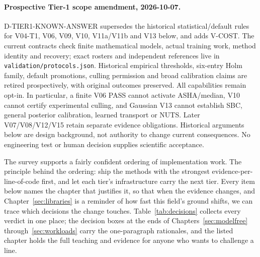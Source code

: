 \paragraph{Prospective Tier-1 scope amendment, 2026-10-07.}
D-TIER1-KNOWN-ANSWER supersedes the historical statistical/default rules for
V04-T1, V06, V09, V10, V11a/V11b and V13 below, and adds V-COST.
The current contracts check finite mathematical models, actual training work,
method identity and recovery; exact rosters and independent references live in
\texttt{validation/protocols.json}. Historical empirical thresholds, six-entry
Holm family, default promotions, culling permission and broad calibration
claims are retired prospectively, with original outcomes preserved.
All capabilities remain opt-in. In particular, a finite V06 PASS cannot activate
ASHA/median, V10 cannot certify experimental culling, and Gaussian V13 cannot
establish SBC, general posterior calibration, learned transport or NUTS.
Later V07/V08/V12/V15 retain separate evidence obligations. Historical arguments
below are design background, not authority to change current consequences.
No engineering test or human decision supplies scientific acceptance.


The survey supports a fairly confident ordering of implementation work. The
principle behind the ordering: ship the methods with the strongest
evidence-per-line-of-code first, and let each tier's infrastructure carry
the next tier. Every item below names the chapter that justifies it, so
that when the evidence changes, and Chapter~\ref{sec:libraries} is a
reminder of how fast this field's ground shifts, we can trace which
decisions the change touches. Table~\ref{tab:decisions} collects every
verdict in one place; the decision boxes at the ends of
Chapters~\ref{sec:modelfree} through~\ref{sec:workloads} carry the
one-paragraph rationales, and the listed chapter holds the full teaching
and evidence for anyone who wants to challenge a line.

